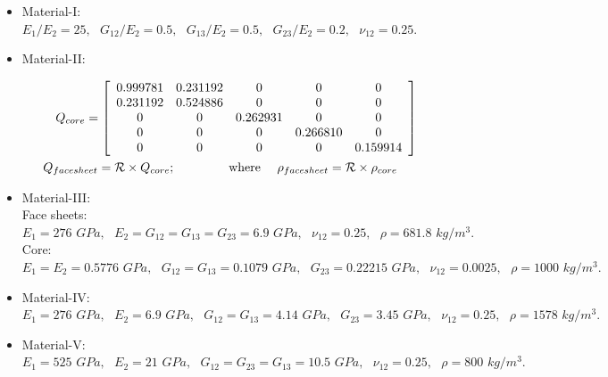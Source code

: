 \documentclass[3p,preprint,12pt]{elsarticle}
\begin{document}
\begin{itemize}
	\item Material-I: \cite{reddy2004mechanics}\\
	$
	{E_{1}}/{E_{2}}=25,\,\,\,\,{G_{12}}/{E_2}=0.5,\,\,\,\,{G_{13}}/{E_2}=0.5,\,\,\,\,	{G_{23}}/{E_2}=0.2,\,\,\,\,\nu_{12}=0.25.
	$	
	\item Material-II: \cite{srinivas1973refined}
	
	\begin{equation*}
	\begin{gathered}
	{Q}_{core}=\left[\begin{array}{ccccc}
	0.999781 & 0.231192 & 0 & 0 & 0\\
	0.231192 & 0.524886 & 0 & 0 & 0\\
	0 & 0 & 0.262931 & 0 & 0\\
	0 & 0 & 0 & 0.266810 & 0\\
	0 & 0 & 0 & 0 & 0.159914
	\end{array}\right] \\
	\hspace{-0.9cm}{Q}_{facesheet}=\mathcal{R} \times {Q}_{core};\hspace{1.5cm}\text{where}\,\,\,\,\,\,\,\,\rho_{facesheet}=\mathcal{R} \times \rho_{core}
	\end{gathered}
	\end{equation*}
	
	\item Material-III: \cite{grover2013analytical}\\
	Face sheets:\\
	$
	E_{1}=276\,\,GPa,\,\,\,\,E_{2}=G_{12}=G_{13}=G_{23}=6.9\,\,GPa,\,\,\,\,\nu_{12}=0.25,\,\,\,\,\rho=681.8\,\,kg/m^3.
	$\\
	Core:\\
	$
	E_{1}=E_{2}=0.5776\,\,GPa,\,\,\,\,G_{12}=G_{13}=0.1079\,\,GPa,\,\,\,\,G_{23}=0.22215\,\,GPa,\,\,\,\,\nu_{12}=0.0025,\,\,\,\,\rho=1000\,\,kg/m^3.
	$
	
	\item Material-IV: \cite{kulkarni2008free}\\
	$
	E_{1}=276\,\,GPa,\,\,\,\,E_{2}=6.9\,\,GPa,\,\,\,\,G_{12}=G_{13}=4.14\,\,GPa,\,\,\,\,G_{23}=3.45\,\,GPa,\,\,\,\,\nu_{12}=0.25,\,\,\,\,\rho=1578\,\,kg/m^3.
	$
	\item Material-V: \cite{chen2000nonlinear}\\
	$
	E_{1}=525\,\,GPa,\,\,\,\,E_{2}=21\,\,GPa,\,\,\,\,G_{12}=G_{23}=G_{13}=10.5\,\,GPa,\,\,\,\,\nu_{12}=0.25,\,\,\,\,\rho=800\,\,kg/m^3.
	$
	

\end{itemize}
\end{document}
